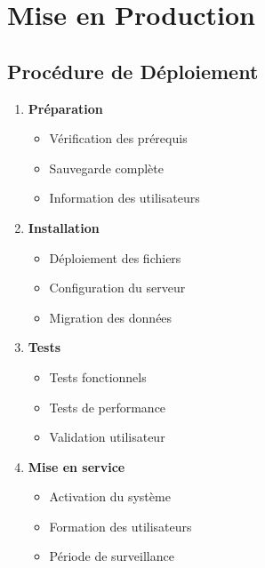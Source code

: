 \documentclass[14pt,a4paper]{report}
\begin{document}
\section{Mise en Production}
\subsection{Procédure de Déploiement}
\begin{enumerate}
    \item \textbf{Préparation}
        \begin{itemize}
            \item Vérification des prérequis
            \item Sauvegarde complète
            \item Information des utilisateurs
        \end{itemize}
    \item \textbf{Installation}
        \begin{itemize}
            \item Déploiement des fichiers
            \item Configuration du serveur
            \item Migration des données
        \end{itemize}
    \item \textbf{Tests}
        \begin{itemize}
            \item Tests fonctionnels
            \item Tests de performance
            \item Validation utilisateur
        \end{itemize}
    \item \textbf{Mise en service}
        \begin{itemize}
            \item Activation du système
            \item Formation des utilisateurs
            \item Période de surveillance
        \end{itemize}
\end{enumerate}
\end{document}
